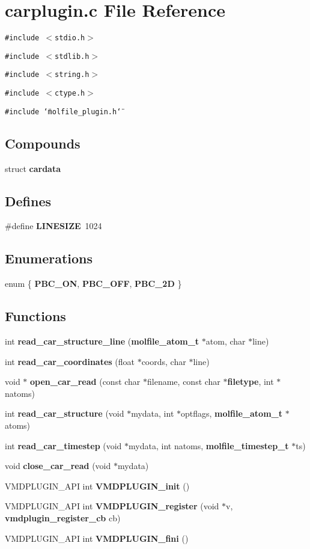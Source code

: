 \section{carplugin.c File Reference}
\label{carplugin_8c}
{\tt \#include $<$stdio.h$>$}\par
{\tt \#include $<$stdlib.h$>$}\par
{\tt \#include $<$string.h$>$}\par
{\tt \#include $<$ctype.h$>$}\par
{\tt \#include \char`\"{}molfile\_\-plugin.h\char`\"{}}\par
\subsection*{Compounds}
\begin{CompactItemize}
\item 
struct {\bf cardata}
\end{CompactItemize}
\subsection*{Defines}
\begin{CompactItemize}
\item 
\#define {\bf LINESIZE}\ 1024
\end{CompactItemize}
\subsection*{Enumerations}
\begin{CompactItemize}
\item 
enum \{ {\bf PBC\_\-ON}, 
{\bf PBC\_\-OFF}, 
{\bf PBC\_\-2D}
 \}
\end{CompactItemize}
\subsection*{Functions}
\begin{CompactItemize}
\item 
int {\bf read\_\-car\_\-structure\_\-line} ({\bf molfile\_\-atom\_\-t} $\ast$atom, char $\ast$line)
\item 
int {\bf read\_\-car\_\-coordinates} (float $\ast$coords, char $\ast$line)
\item 
void $\ast$ {\bf open\_\-car\_\-read} (const char $\ast$filename, const char $\ast${\bf filetype}, int $\ast$natoms)
\item 
int {\bf read\_\-car\_\-structure} (void $\ast$mydata, int $\ast$optflags, {\bf molfile\_\-atom\_\-t} $\ast$atoms)
\item 
int {\bf read\_\-car\_\-timestep} (void $\ast$mydata, int natoms, {\bf molfile\_\-timestep\_\-t} $\ast$ts)
\item 
void {\bf close\_\-car\_\-read} (void $\ast$mydata)
\item 
VMDPLUGIN\_\-API int {\bf VMDPLUGIN\_\-init} ()
\item 
VMDPLUGIN\_\-API int {\bf VMDPLUGIN\_\-register} (void $\ast$v, {\bf vmdplugin\_\-register\_\-cb} cb)
\item 
VMDPLUGIN\_\-API int {\bf VMDPLUGIN\_\-fini} ()
\end{CompactItemize}
